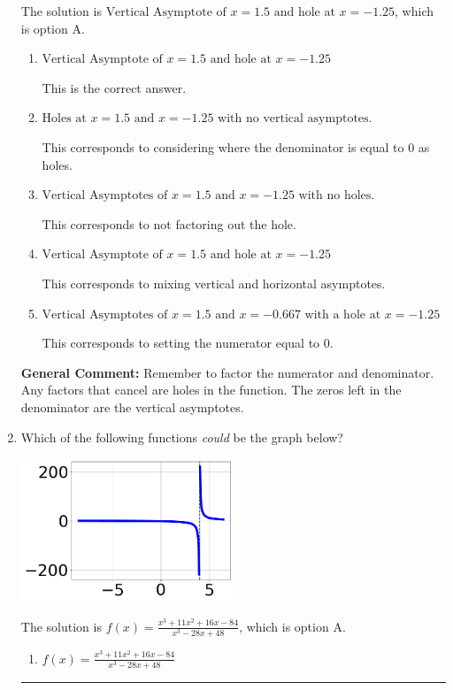 \documentclass{extbook}[14pt]
\newcommand{\litem}[1]{\item #1

\rule{\textwidth}{0.4pt}}
\begin{document}
\begin{enumerate}
{The solution is \( \text{Vertical Asymptote of } x = 1.5 \text{ and hole at } x = -1.25 \), which is option A.\begin{enumerate}[label=\Alph*.]
\item \( \text{Vertical Asymptote of } x = 1.5 \text{ and hole at } x = -1.25 \)

This is the correct answer.
\item \( \text{Holes at } x = 1.5 \text{ and } x = -1.25 \text{ with no vertical asymptotes.} \)

This corresponds to considering where the denominator is equal to 0 as holes.
\item \( \text{Vertical Asymptotes of } x = 1.5 \text{ and } x = -1.25 \text{ with no holes.} \)

This corresponds to not factoring out the hole.
\item \( \text{Vertical Asymptote of } x = 1.5 \text{ and hole at } x = -1.25 \)

This corresponds to mixing vertical and horizontal asymptotes.
\item \( \text{Vertical Asymptotes of } x = 1.5 \text{ and } x = -0.667 \text{ with a hole at } x = -1.25 \)

This corresponds to setting the numerator equal to 0.
\end{enumerate}

\textbf{General Comment:} Remember to factor the numerator and denominator. Any factors that cancel are holes in the function. The zeros left in the denominator are the vertical asymptotes.
}
\litem{
Which of the following functions \textit{could} be the graph below?

\begin{center}
    \includegraphics[width=0.5\textwidth]{../Figures/identifyGraphOfRationalFunctionA.png}
\end{center}




The solution is \( f(x)=\frac{x^{3} +11 x^{2} +16 x -84}{x^{3} -28 x + 48} \), which is option A.\begin{enumerate}[label=\Alph*.]
\item \( f(x)=\frac{x^{3} +11 x^{2} +16 x -84}{x^{3} -28 x + 48} \)


\end{enumerate}}
\end{enumerate}
\end{document}
